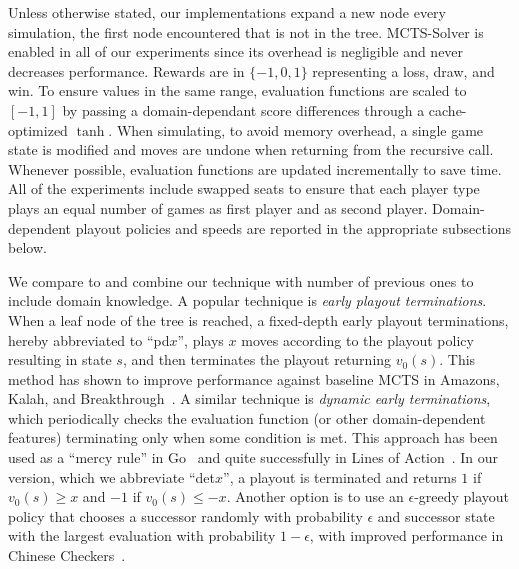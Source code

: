\documentclass[letterpaper]{article}
\begin{document}
Unless otherwise stated, our implementations expand a new node every simulation, the first node encountered
that is not in the tree. MCTS-Solver is enabled in all of our experiments since its overhead is negligible and
never decreases performance. 
Rewards are in $\{-1, 0, 1\}$ representing a loss, draw, and win.
To ensure values in the same range, evaluation functions are scaled to $[-1,1]$ by passing a domain-dependant 
score differences through a cache-optimized $\tanh$. 
When simulating, to avoid memory overhead, a single game state is modified and 
moves are undone when returning from the recursive call.
Whenever possible, evaluation functions are updated incrementally to save time. 
All of the experiments include swapped seats to ensure that each player type plays 
an equal number of games as first player and as second player. 
Domain-dependent playout policies and speeds are reported in the appropriate subsections below.

We compare to and combine our technique with number of previous ones to include  
domain knowledge. A popular technique is {\it early playout terminations}. When a leaf node of the tree 
is reached, a fixed-depth early playout terminations, hereby abbreviated to ``pd$x$'', plays $x$ moves according
to the playout policy resulting in state $s$, and then terminates the playout returning $v_0(s)$. This method has
shown to improve performance against baseline MCTS in Amazons, Kalah, and 
Breakthrough~\cite{Lorentz08Amazons,RamanujanS11,Lorentz13Breakthrough}. A similar technique is 
{\it dynamic early terminations}, which periodically checks the evaluation function (or other domain-dependent features)
terminating only when some condition is met. 
This approach has been used as a ``mercy rule'' in Go~\cite{Bouzy07Old} and quite successfully in 
Lines of Action~\cite{Winands08MCTSSolver}.
In our version, which we abbreviate ``det$x$'', a playout is terminated and returns $1$ if $v_0(s) \ge x$ and 
$-1$ if $v_0(s) \le -x$. Another option is to use an $\epsilon$-greedy playout policy that chooses a successor randomly 
with probability $\epsilon$ and successor state with the largest evaluation with probability $1-\epsilon$, with 
improved performance in Chinese Checkers~\cite{Sturtevant08An,Nijssen12Playout}.
\end{document}
